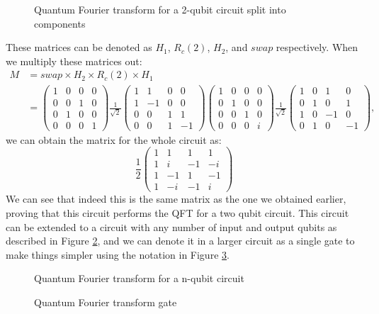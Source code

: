 \begin{figure}[!htb]
\centering
\resizebox{8cm}{!}{}
\caption{Quantum Fourier transform for a 2-qubit circuit split into components}
\label{fig:qft2qubitsplit}
\end{figure}
These matrices can be denoted as $H_1$, $R_c(2)$, $H_2$, and $swap$ respectively. When we multiply these matrices out:
\begin{align*}
M &= swap \times H_2 \times R_c(2) \times H_1\\
&=
\begin{pmatrix}
1 & 0 & 0 & 0\\
0 & 0 & 1 & 0\\
0 & 1 & 0 & 0\\
0 & 0 & 0 & 1
\end{pmatrix} 
\frac{1}{\sqrt{2}}
\begin{pmatrix}
1 & 1 & 0 & 0\\
1 & -1 & 0 & 0\\
0 & 0 & 1 & 1\\
0 & 0 & 1 & -1
\end{pmatrix}
\begin{pmatrix}
1 & 0 & 0 & 0\\
0 & 1 & 0 & 0\\
0 & 0 & 1 & 0\\
0 & 0 & 0 & i
\end{pmatrix}
\frac{1}{\sqrt{2}}
\begin{pmatrix}
1 & 0 & 1 & 0\\
0 & 1 & 0 & 1\\
1 & 0 & -1 & 0\\
0 & 1 & 0 & -1
\end{pmatrix},
\end{align*}
we can obtain the matrix for the whole circuit as:
$$
\frac{1}{2}
\begin{pmatrix}
1 & 1 & 1 & 1\\
1 & i & -1 & -i\\
1 & -1 & 1 & - 1\\
1 & -i & -1 & i
\end{pmatrix}
$$
We can see that indeed this is the same matrix as the one we obtained earlier, proving that this circuit performs the QFT for a two qubit circuit.
This circuit can be extended to a circuit with any number of input and output qubits as described in Figure \ref{fig:QFTnQubit}, and we can denote it in a larger circuit as a single gate to make things simpler using the notation in Figure \ref{fig:QFTgate}.
\begin{figure}[!htb]
\centering
\resizebox{\linewidth}{!}{}
\caption{Quantum Fourier transform for a n-qubit circuit}
\label{fig:QFTnQubit}
\end{figure}
\begin{figure}[!htb]
\centering
\resizebox{3cm}{!}{}
\caption{Quantum Fourier transform gate}
\label{fig:QFTgate}
\end{figure}
